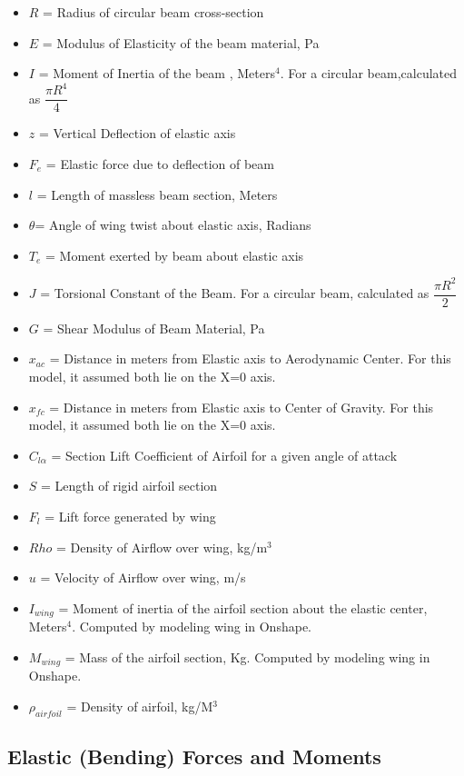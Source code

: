 \documentclass[]{article}
\begin{document}
\begin{itemize}
	
	\item $R$ = Radius of circular beam cross-section
	\item $E$ = Modulus of Elasticity of the beam material, Pa
	\item $I$ = Moment of Inertia of the beam , Meters$^4$. For a circular beam,calculated as $\dfrac{\pi R^4}{4}$
	\item $z$ = Vertical Deflection of elastic axis
	\item $F_e$ = Elastic force due to deflection of beam
	\item $l$ = Length of massless beam section, Meters
	\item $\theta$= Angle of wing twist about elastic axis, Radians
	\item $T_e$ = Moment exerted by beam about elastic axis
	\item $J$ = Torsional Constant of the Beam. For a circular beam, calculated as $\dfrac{\pi R^2}{2}$
	\item $G$ = Shear Modulus of Beam Material, Pa
	\item $x_{ac}$ = Distance in meters from Elastic axis to Aerodynamic Center. For this model, it assumed both lie on the X=0 axis.
	\item $x_{fc}$ = Distance in meters from Elastic axis to Center of Gravity. For this model, it assumed both lie on the X=0 axis.
	\item$C_{l\alpha}$ = Section Lift Coefficient of Airfoil for a given angle of attack
	\item$S$ = Length of rigid airfoil section
	\item$F_l$ = Lift force generated by wing
	\item$Rho$ = Density of Airflow over wing, kg/m$^3$
	\item$u$ = Velocity of Airflow over wing, m/s
	\item$I_{wing}$ = Moment of inertia of the airfoil section about the elastic center, Meters$^4$. Computed by modeling wing in Onshape.
	\item$M_{wing}$ = Mass of the airfoil section, Kg. Computed by modeling wing in Onshape.
	\item$\rho_{airfoil}$ = Density of airfoil, kg/M$^3$
	
	
\end{itemize}

\subsection{Elastic (Bending) Forces and Moments}
\end{document}
